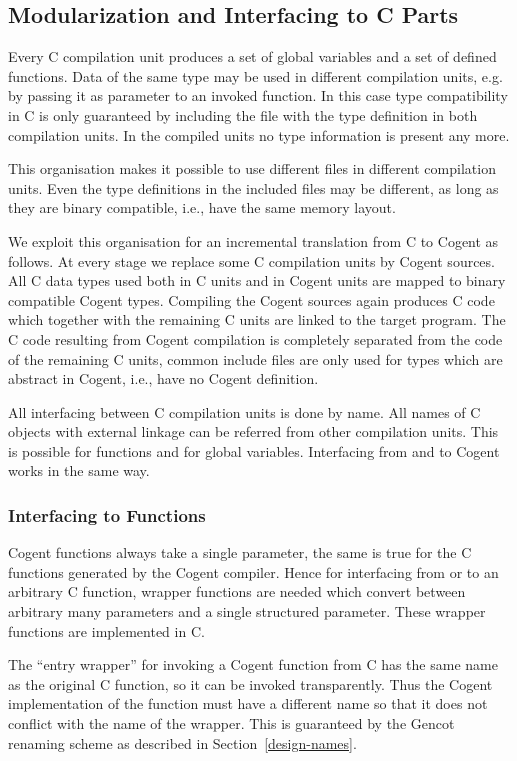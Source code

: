 \subsection{Modularization and Interfacing to C Parts}
\label{design-mdular}

Every C compilation unit produces
a set of global variables and a set of defined functions. Data of the same type may be used in
different compilation units, e.g. by passing it as parameter to an invoked function. In this case type compatibility in C is
only guaranteed by including the  file with the type definition in both compilation units. In the compiled
units no type information is present any more. 

This organisation makes it possible to use different  files in different compilation units. Even the type definitions
in the included files may be different, as long as they are binary compatible, i.e., have the same memory layout.

We exploit this organisation for an incremental translation from C to Cogent as follows. At every stage we replace some 
C compilation units by Cogent sources. All C data types used both in C units and in Cogent units are mapped to binary compatible
Cogent types. Compiling the Cogent sources again produces C code which together with the remaining C units are linked to
the target program. The C code resulting from Cogent compilation is completely separated from the code of the remaining C units,
common include files are only used for types which are abstract in Cogent, i.e., have no Cogent definition.

All interfacing between C compilation units is done by name. All names of C objects with external linkage can be referred
from other compilation units. This is possible for functions and for global variables. Interfacing from and to Cogent works
in the same way. 

\subsubsection{Interfacing to Functions}

Cogent functions always take a single parameter, the same is true for the C functions generated by the Cogent compiler. Hence
for interfacing from or to an arbitrary C function, wrapper functions are needed which convert between arbitrary many parameters
and a single structured parameter. These wrapper functions are implemented in C. 

The ``entry wrapper'' for invoking a Cogent function 
from C has the same name as the original C function, so it can be invoked transparently. Thus the Cogent implementation of
the function must have a different name so that it does not conflict with the name of the wrapper. This is guaranteed by the 
Gencot renaming scheme as described in Section~\ref{design-names}.

